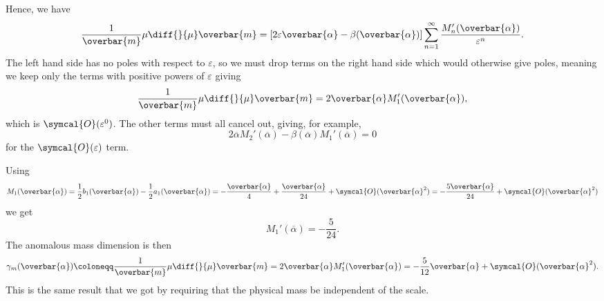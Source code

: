 \documentclass[fleqn]{NotesClass}
\newcommand{\order}{\symcal{O}}
\begin{document}
    Hence, we have
    \begin{equation}
        \frac{1}{\overbar{m}} \mu \diff{}{\mu} \overbar{m} = [2\varepsilon\overbar{\alpha} - \beta(\overbar{\alpha})] \sum_{n = 1}^{\infty} \frac{M_n'(\overbar{\alpha})}{\varepsilon^n}.
    \end{equation}
    The left hand side has no poles with respect to \(\varepsilon\), so we must drop terms on the right hand side which would otherwise give poles, meaning we keep only the terms with positive powers of \(\varepsilon\) giving
    \begin{equation}
        \frac{1}{\overbar{m}} \mu \diff{}{\mu} \overbar{m} = 2\overbar{\alpha} M_1'(\overbar{\alpha}),
    \end{equation}
    which is \(\order(\varepsilon^0)\).
    The other terms must all cancel out, giving, for example,
    \begin{equation}
        2\overbar{\alpha}M_2'(\overbar{\alpha}) - \beta(\overbar{\alpha}) M_1'(\overbar{\alpha}) = 0
    \end{equation}
    for the \(\order(\varepsilon)\) term.
    
    Using 
    \begin{equation}
        M_1(\overbar{\alpha}) = \frac{1}{2}b_1(\overbar{\alpha}) - \frac{1}{2}a_1(\overbar{\alpha}) = -\frac{\overbar{\alpha}}{4} + \frac{\overbar{\alpha}}{24} + \order(\overbar{\alpha}^2) = -\frac{5\overbar{\alpha}}{24} + \order(\overbar{\alpha}^2)
    \end{equation}
    we get
    \begin{equation}
        M_1'(\overbar{\alpha}) = -\frac{5}{24}.
    \end{equation}
    The anomalous mass dimension is then
    \begin{equation}
        \gamma_{m}(\overbar{\alpha}) \coloneqq \frac{1}{\overbar{m}} \mu \diff{}{\mu} \overbar{m} = 2\overbar{\alpha}M_1'(\overbar{\alpha}) = -\frac{5}{12} \overbar{\alpha} + \order(\overbar{\alpha}^2).
    \end{equation}
    This is the same result that we got by requiring that the physical mass be independent of the scale.
    
\end{document}
